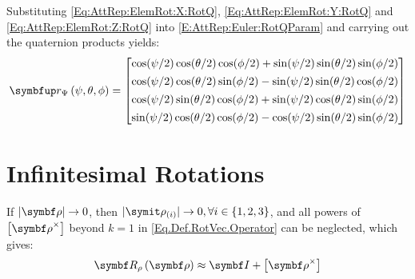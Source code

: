 Substituting \eqref{Eq:AttRep:ElemRot:X:RotQ}, \eqref{Eq:AttRep:ElemRot:Y:RotQ} and \eqref{Eq:AttRep:ElemRot:Z:RotQ} into \eqref{E:AttRep:Euler:RotQParam} and carrying out the quaternion products yields:
\begin{equation}
	\RotQEuler{\psi}{\theta}{\phi} =
	\qcolcmp[1ex]
	{\cos (\psi/2) \cos (\theta/2) \cos (\phi/2) + \sin (\psi/2) \sin (\theta/2) \sin (\phi/2)}
	{\cos (\psi/2) \cos (\theta/2) \sin (\phi/2) - \sin (\psi/2) \sin (\theta/2) \cos (\phi/2)}
	{\cos (\psi/2) \sin (\theta/2) \cos (\phi/2) + \sin (\psi/2) \cos (\theta/2) \sin (\phi/2)}
	{\sin (\psi/2) \cos (\theta/2) \cos (\phi/2) - \cos (\psi/2) \sin (\theta/2) \sin (\phi/2)}
\end{equation}

\begin{comment}

\begin{equation}
	\RotQEuler{\psi}{\theta}{\phi} =
	\qcolcmp[1ex]
	{\cos \frac{\psi}{2} \cos \frac{\theta}{2} \cos \frac{\phi}{2} + \sin \frac{\psi}{2} \sin \frac{\theta}{2} \sin\frac{\phi}{2}} 
	{\cos \frac{\psi}{2} \cos \frac{\theta}{2} \sin \frac{\phi}{2} - \sin \frac{\psi}{2} \sin \frac{\theta}{2} \cos\frac{\phi}{2}}
	{\cos \frac{\psi}{2} \sin \frac{\theta}{2} \cos \frac{\phi}{2} + \sin \frac{\psi}{2} \cos \frac{\theta}{2} \sin\frac{\phi}{2}}
	{\sin \frac{\psi}{2} \cos \frac{\theta}{2} \cos \frac{\phi}{2} - \cos \frac{\psi}{2} \sin \frac{\theta}{2} \sin\frac{\phi}{2}} 
\end{equation}
\begin{equation}
	\RotQEuler{\psi}{\theta}{\phi} =
	\qcolcmp[2ex]
	{\cos \dfrac{\psi}{2} \cos \dfrac{\theta}{2} \cos \dfrac{\phi}{2} + \sin \dfrac{\psi}{2} \sin \dfrac{\theta}{2} \sin\dfrac{\phi}{2}} 
	{\cos \dfrac{\psi}{2} \cos \dfrac{\theta}{2} \sin \dfrac{\phi}{2} - \sin \dfrac{\psi}{2} \sin \dfrac{\theta}{2} \cos\dfrac{\phi}{2}}
	{\cos \dfrac{\psi}{2} \sin \dfrac{\theta}{2} \cos \dfrac{\phi}{2} + \sin \dfrac{\psi}{2} \cos \dfrac{\theta}{2} \sin\dfrac{\phi}{2}}
	{\sin \dfrac{\psi}{2} \cos \dfrac{\theta}{2} \cos \dfrac{\phi}{2} - \cos \dfrac{\psi}{2} \sin \dfrac{\theta}{2} \sin\dfrac{\phi}{2}} 
\end{equation}
\end{comment}

\section{Infinitesimal Rotations} \label{InfRot}
If $|\mcol{\rotvecsymb}| \to 0$, then $|\cmp{\rotvecsymb}{i}| \to 0, \forall i \in \{1,2,3\}$, and all powers of $\vskew{\mcol{\rotvecsymb}}$ beyond $k=1$ in \eqref{Eq.Def.RotVec.Operator} can be neglected, which gives:
\begin{equation}
	\RotMRotV{\mcol{\rotvecsymb}} \approx \IdM + \vskew{\mcol{\rotvecsymb}} \label{Eq.Res.InfRot.Approx}
\end{equation}

